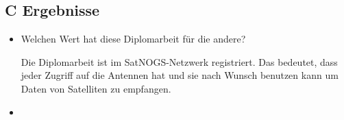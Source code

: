 \subsection*{C Ergebnisse}
\begin{itemize}
	\item Welchen Wert hat diese Diplomarbeit für die andere?
	
	Die Diplomarbeit ist im SatNOGS-Netzwerk registriert. Das bedeutet, dass jeder Zugriff auf die Antennen hat und sie nach Wunsch benutzen kann um Daten von Satelliten zu empfangen.
	
	\item 
\end{itemize}